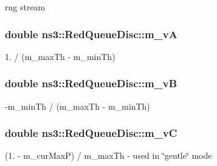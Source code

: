 rng stream 

\subsubsection[{\texorpdfstring{m\+\_\+vA}{m_vA}}]{\setlength{\rightskip}{0pt plus 5cm}double ns3\+::\+Red\+Queue\+Disc\+::m\+\_\+vA\hspace{0.3cm}{\ttfamily [private]}}\hypertarget{classns3_1_1RedQueueDisc_a03f1bf584c3f8f07a33719f54b73dd76}{}\label{classns3_1_1RedQueueDisc_a03f1bf584c3f8f07a33719f54b73dd76}


1. / (m\+\_\+max\+Th -\/ m\+\_\+min\+Th) 

\subsubsection[{\texorpdfstring{m\+\_\+vB}{m_vB}}]{\setlength{\rightskip}{0pt plus 5cm}double ns3\+::\+Red\+Queue\+Disc\+::m\+\_\+vB\hspace{0.3cm}{\ttfamily [private]}}\hypertarget{classns3_1_1RedQueueDisc_a983ababdb1d4eecd65c2f08af7ab5cd3}{}\label{classns3_1_1RedQueueDisc_a983ababdb1d4eecd65c2f08af7ab5cd3}


-\/m\+\_\+min\+Th / (m\+\_\+max\+Th -\/ m\+\_\+min\+Th) 

\subsubsection[{\texorpdfstring{m\+\_\+vC}{m_vC}}]{\setlength{\rightskip}{0pt plus 5cm}double ns3\+::\+Red\+Queue\+Disc\+::m\+\_\+vC\hspace{0.3cm}{\ttfamily [private]}}\hypertarget{classns3_1_1RedQueueDisc_ae06b2dbe2b79013c1b7682bbda4fd182}{}\label{classns3_1_1RedQueueDisc_ae06b2dbe2b79013c1b7682bbda4fd182}


(1. -\/ m\+\_\+cur\+MaxP) / m\+\_\+max\+Th -\/ used in \char`\"{}gentle\char`\"{} mode 

